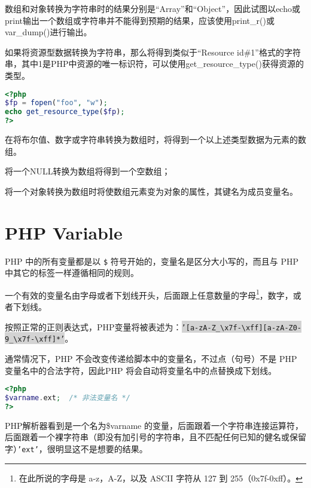 数组和对象转换为字符串时的结果分别是“Array”和“Object”，因此试图以echo或print输出一个数组或字符串并不能得到预期的结果，应该使用print\_r()或var\_dump()进行输出。

如果将资源型数据转换为字符串，那么将得到类似于“Resource id\#1”格式的字符串，其中1是PHP中资源的唯一标识符，可以使用get\_resource\_type()获得资源的类型。

\begin{lstlisting}[language=PHP]
<?php
$fp = fopen("foo", "w");
echo get_resource_type($fp);
?>
\end{lstlisting}

在将布尔值、数字或字符串转换为数组时，将得到一个以上述类型数据为元素的数组。

\begin{compactitem}
\item 将一个NULL转换为数组将得到一个空数组；
\item 将一个对象转换为数组时将使数组元素变为对象的属性，其键名为成员变量名。
\end{compactitem}



\chapter{PHP Variable}






PHP 中的所有变量都是以 \texttt{\$} 符号开始的，变量名是区分大小写的，而且与 PHP 中其它的标签一样遵循相同的规则。

一个有效的变量名由字母或者下划线开头，后面跟上任意数量的字母\footnote{在此所说的字母是 a-z，A-Z，以及 ASCII 字符从 127 到 255（0x7f-0xff）。}，数字，或者下划线。

按照正常的正则表达式，PHP变量将被表述为：\colorbox{lightgray}{\texttt{'[a-zA-Z\_\textbackslash x7f-\textbackslash xff][a-zA-Z0-9\_\textbackslash x7f-\textbackslash xff]*'}}。

通常情况下，PHP 不会改变传递给脚本中的变量名，不过点（句号）不是 PHP 变量名中的合法字符，因此PHP 将会自动将变量名中的点替换成下划线。

\begin{lstlisting}[language=PHP]
<?php
$varname.ext;  /* 非法变量名 */
?>
\end{lstlisting}

PHP解析器看到是一个名为\$varname 的变量，后面跟着一个字符串连接运算符，后面跟着一个裸字符串（即没有加引号的字符串，且不匹配任何已知的健名或保留字）\texttt{'ext'}，很明显这不是想要的结果。

